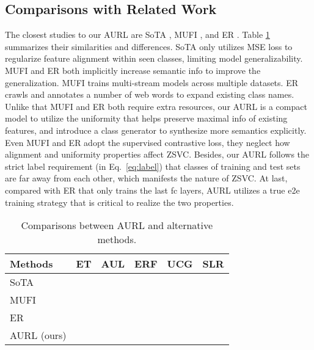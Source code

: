 \documentclass[10pt,twocolumn,letterpaper]{article}
\newlength\figsep\setlength{\figsep}{-2.8ex}
\begin{document}
\subsection{Comparisons with Related Work}
The closest studies to our AURL are SoTA \cite{brattoli2020rethinking}, MUFI \cite{qiu2021boosting}, and ER \cite{chen2021elaborative}.
Table \ref{tab:related} summarizes their similarities and differences.
SoTA only utilizes MSE loss to regularize feature alignment within seen classes, limiting model generalizability.
MUFI and ER both implicitly increase semantic info to improve the generalization.
MUFI trains multi-stream models across multiple datasets.
ER crawls and annotates a number of web words to expand existing class names.
Unlike that MUFI and ER both require extra resources, our AURL is a compact model to utilize the uniformity that helps preserve maximal info of existing features, and introduce a class generator to synthesize more semantics explicitly. 
Even MUFI and ER adopt the supervised contrastive loss, they neglect how alignment and uniformity properties affect ZSVC.
Besides, our AURL follows the strict label requirement (in Eq.~\ref{eq:label}) that classes of training and test sets are far away from each other, which manifests the nature of ZSVC.  
At last, compared with ER that only trains the last fc layers, AURL utilizes a true e2e training strategy that is critical to realize the two properties.
\begin{table}
	\centering\small
	\def\vv{\hspace{2.2pt}}
	\newcommand{\mv}[1]{\vv #1 \vv}
	\caption{Comparisons between AURL and alternative methods.}
	\label{tab:related}
	\begin{tabular}{l*{5}{c}}
	\toprule
		{\bf Methods} & \mv{\bf{ET}} & \mv{\bf{AUL}} & \mv{\bf{ERF}} & \mv{\bf{UCG}} & \mv{\bf{SLR}}\\
	\midrule
		SoTA \cite{brattoli2020rethinking} & & & & &\\
    	MUFI \cite{qiu2021boosting} & & & &&\\
    	ER \cite{chen2021elaborative}& & & &&\\
    	AURL (ours) &  &  &  & &\\
	\bottomrule
	\end{tabular}
	\vspace{-6pt}
	\vspace{\figsep}
\end{table}
\end{document}

